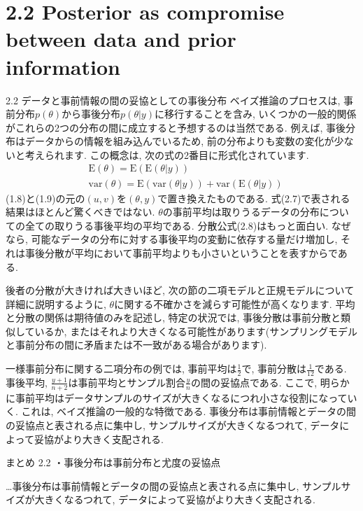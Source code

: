 \documentclass[10pt,dvipdfmx,a4]{beamer}
\newcommand{\eq}[1]{\begin{align}#1\end{align}}
\begin{document}
\section{2.2 Posterior as compromise between data and prior information}
\begin{frame}{2.2 データと事前情報の間の妥協としての事後分布}
ベイズ推論のプロセスは, 事前分布$p(\theta)$から事後分布$p(\theta|y)$に移行することを含み, いくつかの一般的関係がこれらの2つの分布の間に成立すると予想するのは当然である.
例えば, 事後分布はデータからの情報を組み込んでいるため, 前の分布よりも変数の変化が少ないと考えられます.
この概念は, 次の式の2番目に形式化されています.
\eq{&\text{E}(\theta)=\text{E}(\text{E}(\theta|y))\\
&\text{var}(\theta)=\text{E}(\text{var}(\theta|y))+\text{var}(\text{E}(\theta|y))}
(1.8)と(1.9)の元の$(u, v)$を$(\theta, y)$で置き換えたものである.
式(2.7)で表される結果はほとんど驚くべきではない.
$\theta$の事前平均は取りうるデータの分布についての全ての取りうる事後平均の平均である.
分散公式(2.8)はもっと面白い.
なぜなら, 可能なデータの分布に対する事後平均の変動に依存する量だけ増加し, それは事後分散が平均において事前平均よりも小さいということを表すからである.
\end{frame}


\begin{frame}
後者の分散が大きければ大きいほど, 次の節の二項モデルと正規モデルについて詳細に説明するように, $\theta$に関する不確かさを減らす可能性が高くなります.
平均と分散の関係は期待値のみを記述し, 特定の状況では, 事後分散は事前分散と類似しているか, またはそれより大きくなる可能性があります(サンプリングモデルと事前分布の間に矛盾または不一致がある場合があります).

一様事前分布に関する二項分布の例では, 事前平均は$\tfrac{1}{2}$で, 事前分散は$\tfrac{1}{12}$である.
事後平均, $\tfrac{y+1}{n+2}$は事前平均とサンプル割合$\tfrac{y}{n}$の間の妥協点である.
ここで, 明らかに事前平均はデータサンプルのサイズが大きくなるにつれ小さな役割になっていく.
これは, ベイズ推論の一般的な特徴である.
事後分布は事前情報とデータの間の妥協点と表される点に集中し, サンプルサイズが大きくなるつれて, データによって妥協がより大きく支配される.
\end{frame}


\begin{frame}[t]{まとめ 2.2}
・事後分布は事前分布と尤度の妥協点

…事後分布は事前情報とデータの間の妥協点と表される点に集中し, サンプルサイズが大きくなるつれて, データによって妥協がより大きく支配される.

\end{frame}
\end{document}
